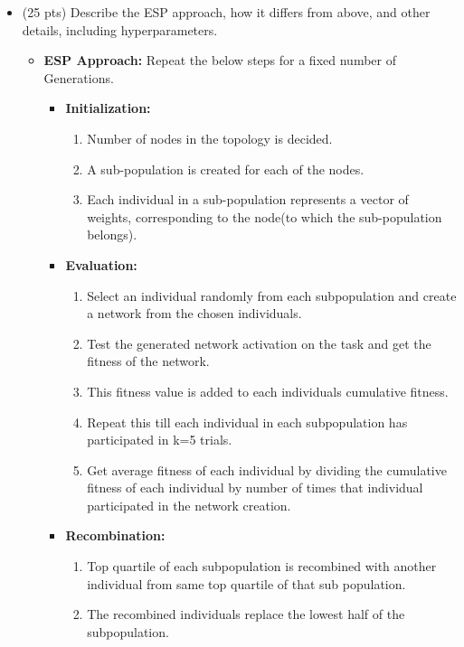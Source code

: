 \documentclass{article}
\begin{document}
\begin{itemize}
\color{black}
	\item (25 pts) Describe the ESP approach, how it differs from above, and other details, including hyperparameters.
	\color{blue}
	\begin{itemize}
	\item \textbf{ESP Approach:}
	Repeat the below steps for a fixed number of Generations.
	\begin{itemize}
	\item \textbf{Initialization:}
	\begin{enumerate}
	\item Number of nodes in the topology is decided.
	\item A sub-population is created for each of the nodes.
	\item Each individual in a sub-population represents a vector of weights, corresponding to the node(to which the sub-population belongs).	
	\end{enumerate}
	\item \textbf{Evaluation:}
	\begin{enumerate}
	\item Select an individual randomly from each subpopulation and create a network from the chosen individuals.
	\item Test the generated network activation on the task and get the fitness of the network.
	\item This fitness value is added to each individuals cumulative fitness.
	\item Repeat this till each individual in each subpopulation has participated in k=5 trials.
	\item Get average fitness of each individual by dividing the cumulative fitness of each individual by number of times that individual participated in the network creation.
	\end{enumerate}
	\item \textbf{Recombination:}
	\begin{enumerate}
	\item Top quartile of each subpopulation is recombined with another individual from same top quartile of that sub population.
	\item The recombined individuals replace the lowest half of the subpopulation.
	  

\end{enumerate}
\end{itemize}
\end{itemize}
\end{itemize}
\end{document}
